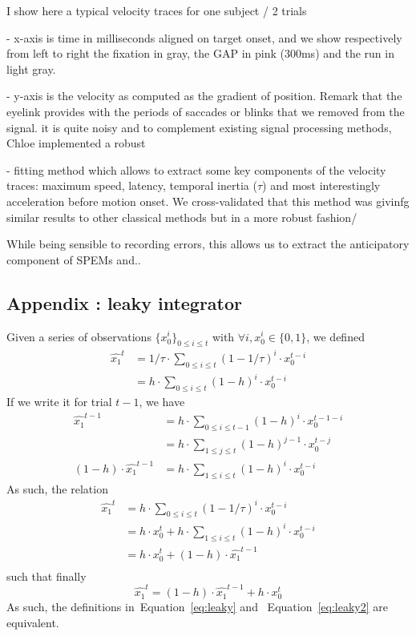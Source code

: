 \documentclass[12pt,english]{article}%
\newcommand{\eq}[1]{\begin{equation*}#1\end{equation*}}
\newcommand{\eqs}[1]{\begin{align*}#1\end{align*}}
\newcommand{\seeEq}[1]{Equation~\ref{eq:#1}}
\begin{document}
I show here a typical velocity traces for one subject / 2 trials

- x-axis is time in milliseconds aligned on target onset,
and we show respectively from left to right the fixation in gray,
the GAP in pink (300ms) and the run in light gray.

- y-axis is the velocity as computed as the gradient of position.
Remark that the eyelink provides with the periods of saccades or
 blinks that we removed from the signal. it is quite noisy and
 to complement existing signal processing methods,
 Chloe implemented a robust

- fitting method which allows to extract some key components of
the velocity traces: maximum speed, latency, temporal inertia ($\tau$)
 and most interestingly acceleration before motion onset.
 We cross-validated that this method was givinfg similar results
  to other classical methods but in a more robust fashion/

While being sensible to recording errors, this allows us to extract the
 anticipatory component of SPEMs and..

\subsection{Appendix : leaky integrator}
\label{app:leaky}
Given a series of observations $\{x_0^i\}_{0\leq i \leq t}$ 
with $\forall i, x_0^i \in \{0, 1 \}$, we defined
\eqs{
\hat{x_1}^{t} &= 1/\tau \cdot \sum_{0\leq i \leq t} (1 - 1/\tau)^{i} \cdot x_0^{t-i}\\
			  &= h \cdot \sum_{0\leq i \leq t} (1 - h)^{i} \cdot x_0^{t-i}
}
If we write it for trial $t-1$, we have
\eqs{
\hat{x_1}^{t-1}	&= h \cdot \sum_{0\leq i \leq t-1} (1 - h)^{i} \cdot x_0^{t-1-i} \\
                &= h \cdot \sum_{1\leq j \leq t} (1 - h)^{j-1} \cdot x_0^{t-j} \\ %
(1 - h) \cdot \hat{x_1}^{t-1} &= h \cdot \sum_{1\leq i \leq t} (1 - h)^{i} \cdot x_0^{t-i} 
                }
As such, the relation 
\eqs{
\hat{x_1}^{t}	&= h \cdot \sum_{0\leq i \leq t} (1 - 1/\tau)^{i} \cdot x_0^{t-i} \\
				&= h \cdot x_0^{t} + h \cdot \sum_{1\leq i \leq t} (1 - h)^{i} \cdot x_0^{t-i} \\
				&= h \cdot x_0^{t} + (1 - h) \cdot \hat{x_1}^{t-1} \\
}
such that finally
\eq{
\hat{x_1}^{t} = (1 - h) \cdot \hat{x_1}^{t-1} + h \cdot x_0^t
}
As such, the definitions in~\seeEq{leaky} and ~\seeEq{leaky2} are equivalent.
\end{document}
